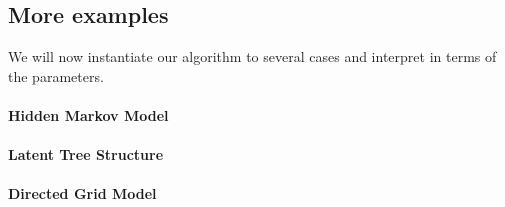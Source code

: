 \subsection{More examples}

We will now instantiate our algorithm to several cases and interpret
 in terms of the parameters.

\paragraph{Hidden Markov Model}

\paragraph{Latent Tree Structure}

\paragraph{Directed Grid Model}

